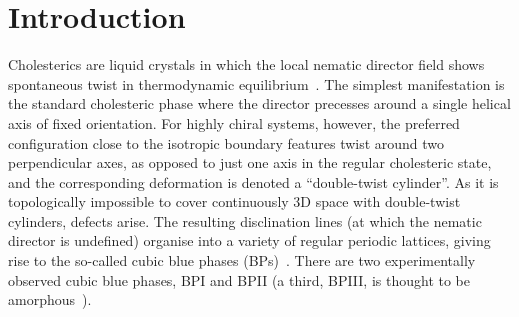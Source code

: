 \documentclass[8.5pt,twoside,twocolumn]{article}
\begin{document}





\section{Introduction}

Cholesterics are liquid crystals in which the local nematic director field shows spontaneous 
twist in thermodynamic equilibrium~\cite{deGennes}. 
The simplest manifestation is the standard cholesteric phase where the
director precesses around a single helical axis of fixed orientation.
For highly chiral systems, however,
the preferred configuration close 
to the isotropic boundary features twist around two perpendicular axes, as opposed to 
just one axis in the regular cholesteric state, and the corresponding deformation is 
denoted a ``double-twist cylinder''.
As it is topologically impossible to cover continuously 3D space with double-twist 
cylinders, defects arise. The resulting disclination lines (at which the
nematic director is undefined)
 organise into a variety of regular periodic lattices, 
giving rise to the so-called cubic blue phases (BPs)~\cite{Grebel:1984,Wright:1989}. 
There are two experimentally observed cubic blue phases, BPI and BPII (a third, BPIII, 
is thought to be amorphous~\cite{Henrich:2011a}).
\end{document}
